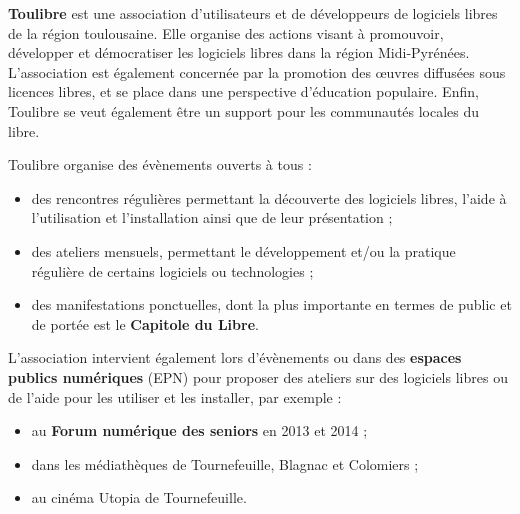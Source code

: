
\textbf{Toulibre} est une association d'utilisateurs et de développeurs de logiciels libres de la région toulousaine. Elle organise des actions visant à promouvoir, développer et démocratiser les logiciels libres dans la région Midi-Pyrénées. L'association est également concernée par la promotion des œuvres diffusées sous licences libres, et se place dans une perspective d'éducation populaire. Enfin, Toulibre se veut également être un support pour les communautés locales du libre.

\Separateur

Toulibre organise des évènements ouverts à tous :
\begin{itemize}[label=$\bullet$]
\item des rencontres régulières permettant la découverte des logiciels libres, l'aide à l'utilisation et l'installation ainsi que de leur présentation ;
\item des ateliers mensuels, permettant le développement et/ou la 
pratique régulière de certains logiciels ou technologies ;
\item des manifestations ponctuelles, dont la plus importante en termes 
de public et de portée est le \textbf{Capitole du Libre}.
\end{itemize}

L'association intervient également lors d'évènements ou dans des \textbf{espaces publics numériques} (EPN) pour proposer des ateliers sur des logiciels libres ou de l'aide pour les utiliser et les installer, par exemple :
\begin{itemize}[label=$\bullet$]
\item au \textbf{Forum numérique des seniors} en 2013 et 2014 ;
\item dans les médiathèques de Tournefeuille, Blagnac et Colomiers ;
\item au cinéma Utopia de Tournefeuille.
\end{itemize}
